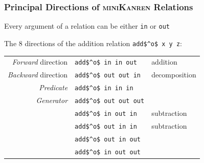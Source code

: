 \documentclass[xcolor=table]{beamer}
\newcommand{\mk}{\textsc{miniKanren}\xspace}
\begin{document}
\begin{frame}[fragile]
  \frametitle{Principal Directions of \mk Relations}
\begin{center}
  Every argument of a relation can be either \lstinline{in} or \lstinline{out}
\end{center}

\vfill

\begin{center}
  The 8 directions of the addition relation \lstinline{add$^o$ x y z}:
\end{center}

\begin{center}
\begin{tabular}{rll}
  \emph{Forward} direction  & \lstinline|add$^o$ in in out|   & addition      \\
  \emph{Backward} direction & \lstinline|add$^o$ out out in|  & decomposition \\
  \emph{Predicate}          & \lstinline|add$^o$ in in in|    &               \\
  \emph{Generator}          & \lstinline|add$^o$ out out out| &               \\
                            & \lstinline|add$^o$ in out in|   & subtraction   \\
                            & \lstinline|add$^o$ out in in|   & subtraction   \\
                            & \lstinline|add$^o$ out in out|  &               \\
                            & \lstinline|add$^o$ in out out|  &
\end{tabular}
\end{center}
\end{frame}
\end{document}
